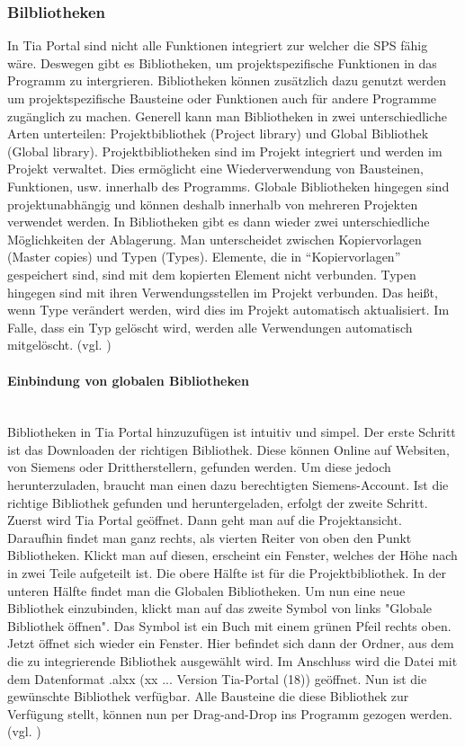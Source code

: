     \subsubsection{Bilbliotheken } \mbox{}
    In Tia Portal sind nicht alle Funktionen integriert zur welcher die SPS fähig wäre. Deswegen gibt es Bibliotheken, um projektspezifische Funktionen in das Programm zu intergrieren. Bibliotheken können zusätzlich dazu genutzt werden um projektspezifische Bausteine oder Funktionen auch für andere Programme zugänglich zu machen. Generell kann man Bibliotheken in zwei unterschiedliche Arten unterteilen: Projektbibliothek (Project library) und Global Bibliothek (Global library). Projektbibliotheken sind im Projekt integriert und werden im Projekt verwaltet. Dies ermöglicht eine Wiederverwendung von Bausteinen, Funktionen, usw. innerhalb des Programms. Globale Bibliotheken hingegen sind projektunabhängig und können deshalb innerhalb von mehreren Projekten verwendet werden. In Bibliotheken gibt es dann wieder zwei unterschiedliche Möglichkeiten der Ablagerung. Man unterscheidet zwischen Kopiervorlagen (Master copies) und Typen (Types). Elemente, die in \enquote{Kopiervorlagen} gespeichert sind, sind mit dem kopierten Element nicht verbunden. Typen hingegen sind mit ihren Verwendungsstellen im Projekt verbunden. Das heißt, wenn Type verändert werden, wird dies im Projekt automatisch aktualisiert. Im Falle, dass ein Typ gelöscht wird, werden alle Verwendungen automatisch mitgelöscht.  
    (vgl. \cite{Programmierleitfaden_für_S7-1500})


        \paragraph{Einbindung von globalen Bibliotheken} \label{Bilbliotheken} \mbox{} \\
        Bibliotheken in Tia Portal hinzuzufügen ist intuitiv und simpel. Der erste Schritt ist das Downloaden der richtigen Bibliothek. Diese können Online auf Websiten, von Siemens oder Drittherstellern, gefunden werden. Um diese jedoch herunterzuladen, braucht man einen dazu berechtigten Siemens-Account. Ist die richtige Bibliothek gefunden und heruntergeladen, erfolgt der zweite Schritt. Zuerst wird Tia Portal geöffnet. Dann geht man auf die Projektansicht. Daraufhin findet man ganz rechts, als vierten Reiter von oben den Punkt Bibliotheken. Klickt man auf diesen, erscheint ein Fenster, welches der Höhe nach in zwei Teile aufgeteilt ist. Die obere Hälfte ist für die Projektbibliothek. In der unteren Hälfte findet man die Globalen Bibliotheken. Um nun eine neue Bibliothek einzubinden, klickt man auf das zweite Symbol von links "Globale Bibliothek öffnen". Das Symbol ist ein Buch mit einem grünen Pfeil rechts oben. Jetzt öffnet sich wieder ein Fenster. Hier befindet sich  dann der Ordner, aus dem die zu integrierende Bibliothek ausgewählt wird. Im Anschluss wird die Datei mit dem Datenformat .alxx (xx ... Version Tia-Portal (18)) geöffnet. Nun ist die gewünschte Bibliothek verfügbar. Alle Bausteine die diese Bibliothek zur Verfügung stellt, können nun per Drag-and-Drop ins Programm gezogen werden.
        (vgl. \cite{Bibliotheken})


